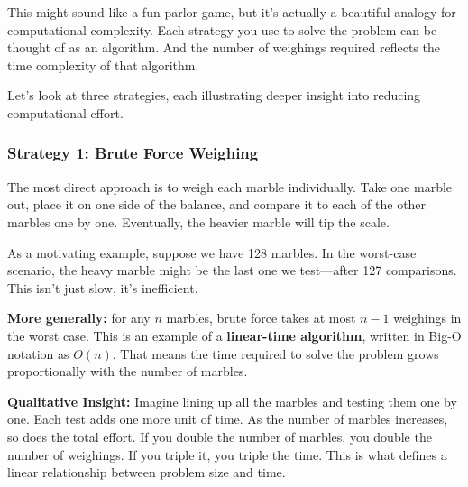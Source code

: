 This might sound like a fun parlor game, but it’s actually a beautiful analogy for computational complexity. Each strategy you use to solve the problem can be thought of as an algorithm. And the number of weighings required reflects the time complexity of that algorithm.

Let’s look at three strategies, each illustrating deeper insight into reducing computational effort.

\subsubsection{Strategy 1: Brute Force Weighing}

The most direct approach is to weigh each marble individually. Take one marble out, place it on one side of the balance, and compare it to each of the other marbles one by one. Eventually, the heavier marble will tip the scale.

As a motivating example, suppose we have 128 marbles. In the worst-case scenario, the heavy marble might be the last one we test—after 127 comparisons. This isn't just slow, it’s inefficient.

\textbf{More generally:} for any \( n \) marbles, brute force takes at most \( n - 1 \) weighings in the worst case. This is an example of a \textbf{linear-time algorithm}, written in Big-O notation as \( O(n) \). That means the time required to solve the problem grows proportionally with the number of marbles.

\medskip

\noindent\textbf{Qualitative Insight:} Imagine lining up all the marbles and testing them one by one. Each test adds one more unit of time. As the number of marbles increases, so does the total effort. If you double the number of marbles, you double the number of weighings. If you triple it, you triple the time. This is what defines a linear relationship between problem size and time.

\begin{center}
\end{center}



